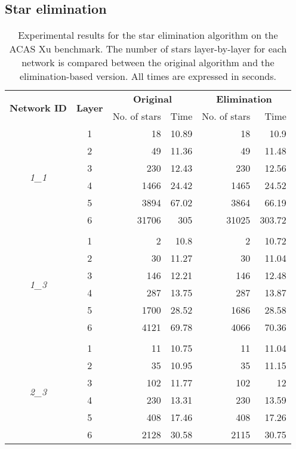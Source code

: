 \subsection{Star elimination}

\begin{table}[t!]
	\setlength{\tabcolsep}{13pt}
	\centering
	\caption{\label{tab:acas_optim} Experimental results for the star elimination 
		algorithm on the ACAS Xu benchmark. The number of stars layer-by-layer for
		each network is compared between the original algorithm and the 
		elimination-based version. All times are expressed in seconds.}
	\begin{tabular}{c c rr rr}
		\toprule
		\multirow{2}{*}{\textbf{Network ID}} & \multirow{2}{*}{\textbf{Layer}} & 
		\multicolumn{2}{c}{\textbf{Original}} & \multicolumn{2}{c}{\textbf{Elimination}} \\
		\cmidrule{3-6} 
		 & & No. of stars & Time & No. of stars & Time \\
		\midrule
 		\multirow{6}{*}{\textit{1\_1}}
 		 & 1 & 18 & 10.89 & 18 & 10.9 \\ 
 		 & 2 & 49 & 11.36 & 49 & 11.48 \\ 
 		 & 3 & 230 & 12.43 & 230 & 12.56 \\ 
 		 & 4 & 1466 & 24.42 & 1465 & 24.52 \\ 
 		 & 5 & 3894 & 67.02 & 3864 & 66.19 \\ 
 		 & 6 & 31706 & 305 & 31025 & 303.72 \\ 
 		  & & & & & \\
 		\multirow{6}{*}{\textit{1\_3}}
 		 & 1 & 2 & 10.8 & 2 & 10.72 \\ 
 		 & 2 & 30 & 11.27 & 30 & 11.04 \\ 
 		 & 3 & 146 & 12.21 & 146 & 12.48 \\ 
 		 & 4 & 287 & 13.75 & 287 & 13.87 \\ 
 		 & 5 & 1700 & 28.52 & 1686 & 28.58 \\ 
 		 & 6 & 4121 & 69.78 & 4066 & 70.36 \\ 
 		  & & & & & \\
 		\multirow{6}{*}{\textit{2\_3}}
 		 & 1 & 11 & 10.75 & 11 & 11.04 \\ 
 		 & 2 & 35 & 10.95 & 35 & 11.15 \\ 
 		 & 3 & 102 & 11.77 & 102 & 12 \\ 
 		 & 4 & 230 & 13.31 & 230 & 13.59 \\ 
 		 & 5 & 408 & 17.46 & 408 & 17.26 \\ 
 		 & 6 & 2128 & 30.58 & 2115 & 30.75 \\ 
 		\bottomrule
	\end{tabular} 
\end{table}

